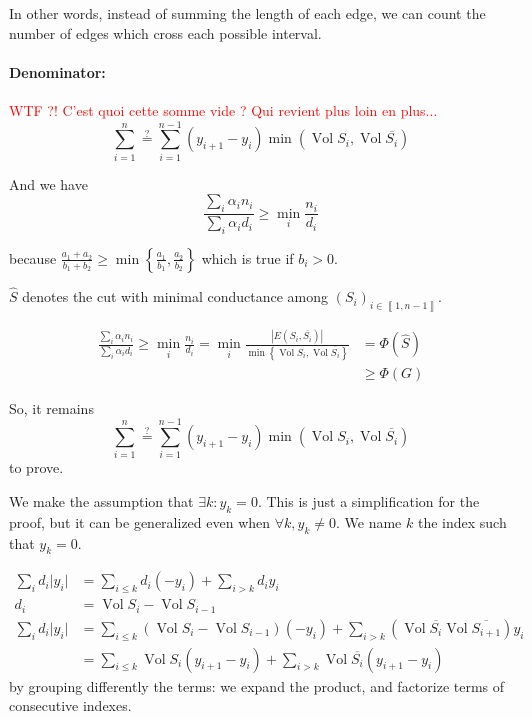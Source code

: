 \documentclass[12pt]{article}
\newcommand{\set}[1]{\left\{ #1 \right\}}
\newcommand{\brackets}[1]{\left\llbracket #1 \right\rrbracket}
\newcommand{\wtf}[1]{\Huge\textcolor{red}{WTF ?! #1}\normalsize}
\newcommand{\card}[1]{\left\lvert#1\right\rvert}
\DeclareMathOperator{\vol}{Vol}
\begin{document}
In other words, instead of summing the length of each edge, we can count the number of edges which cross each possible interval. 

\paragraph{Denominator:}

\wtf{C'est quoi cette somme vide ? Qui revient plus loin en plus...}
\[
    \sum\limits_{i=1}^n \overset{?}{=} \sum\limits_{i=1}^{n-1} (y_{i+1} - y_i) \min(\vol S_i, \vol \overline{S_i})
\]

And we have
\[
    \frac{\sum\limits_i \alpha_i n_i}{\sum\limits_i \alpha_i d_i} \geqslant \min\limits_i \frac{n_i}{d_i}
\]

because $\frac{a_1+a_2}{b_1+b_2} \geqslant \min\set{\frac{a_1}{b_1},\frac{a_2}{b_2}}$ which is true if $b_i > 0$.


$\widehat{S}$ denotes the cut with minimal conductance among $(S_i)_{i\in\brackets{1,n-1}}$.


\[
    \begin{aligned}
        \frac{\sum\limits_i \alpha_i n_i}{\sum\limits_i \alpha_i d_i} \geqslant \min\limits_i \frac{n_i}{d_i} = \min_i \frac{\card{E(S_i,\overline{S_i})}}{\min\set{\vol S_i,\vol \overline{S_i}}} &= \Phi(\widehat{S})\\
        &\geqslant \Phi(G)
    \end{aligned}
\]

So, it remains 
\[
    \sum\limits_{i=1}^n \overset{?}{=} \sum\limits_{i=1}^{n-1} (y_{i+1} - y_i) \min(\vol S_i, \vol \overline{S_i})
\]
to prove.

\bigskip


We make the assumption that $\exists k : y_k = 0$. This is just a simplification for the proof, but it can be generalized even when $\forall k, y_k \neq 0$. We name $k$ the index such that $y_k = 0$.

\[
    \begin{aligned}
        \sum\limits_i d_i\lvert y_i \rvert &= \sum\limits_{i\leqslant k} d_i(-y_i) + \sum\limits_{i > k}d_i y_i\\
       d_i &= \vol S_i - \vol S_{i-1}\\
       \sum\limits_i d_i\lvert y_i \rvert &= \sum\limits_{i\leqslant k} (\vol S_i - \vol S_{i-1})(-y_i) + \sum\limits_{i>k} \left(\vol \overline{S_i} \vol \overline{S_{i+1}} \right)y_i\\
       &= \sum\limits_{i\leqslant k} \vol S_i (y_{i+1} -y_i) + \sum\limits_{i>k} \vol \overline{S_i} (y_{i+1} - y_i)
    \end{aligned}
\]
by grouping differently the terms: we expand the product, and factorize terms of consecutive indexes.
\end{document}
